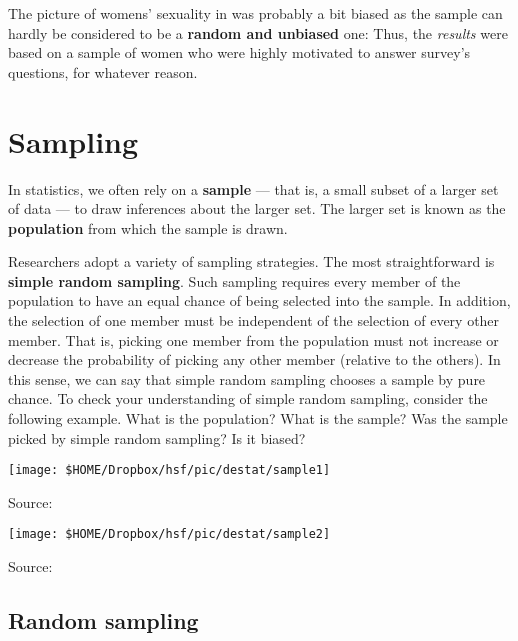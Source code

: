 The picture of womens' sexuality in \cite{Hite1976Hite} was probably a bit biased as the sample can hardly be considered to be a \textbf{random and unbiased} one:
Thus, the \textit{results} were based on a sample of women who were highly motivated to answer survey's questions, for whatever reason.




\section{Sampling}
In statistics, we often rely on a \textbf{sample} --- that is, a small subset of a larger set of
data --- to draw inferences about the larger set. The larger set is known as the
\textbf{population} from which the sample is drawn.

Researchers adopt a variety of sampling strategies. The most straightforward is
\textbf{simple random sampling}. Such sampling requires every member of the population
to have an equal chance of being selected into the sample. In addition, the selection
of one member must be independent of the selection of every other member. That
is, picking one member from the population must not increase or decrease the
probability of picking any other member (relative to the others). In this sense, we
can say that simple random sampling chooses a sample by pure chance. To check
your understanding of simple random sampling, consider the following example.
What is the population? What is the sample? Was the sample picked by simple
random sampling? Is it biased?

\begin{center}\texttt{[image: \$HOME/Dropbox/hsf/pic/destat/sample1]}
	
	Source: \citet[p. 92]{Gonick1993Cartoon}\end{center}


\begin{center}\texttt{[image: \$HOME/Dropbox/hsf/pic/destat/sample2]}
	
	Source: \citet[p. 92]{Gonick1993Cartoon}\end{center}


\subsection{Random sampling}

